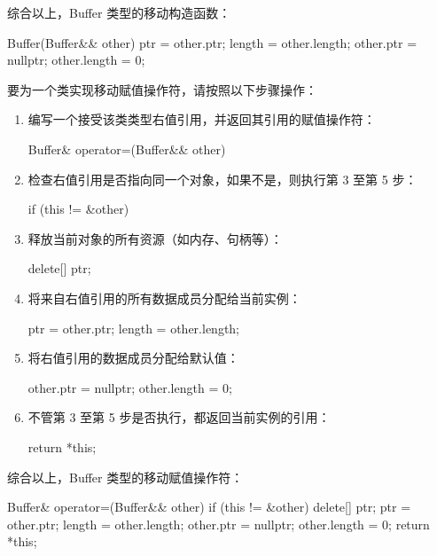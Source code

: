 综合以上，Buffer 类型的移动构造函数：

\begin{cpp}
Buffer(Buffer&& other)
{
    ptr = other.ptr;
    length = other.length;
    other.ptr = nullptr;
    other.length = 0;
}
\end{cpp}

要为一个类实现移动赋值操作符，请按照以下步骤操作：

\begin{enumerate}
\item
编写一个接受该类类型右值引用，并返回其引用的赋值操作符：

\begin{cpp}
Buffer& operator=(Buffer&& other)
{
}
\end{cpp}

\item
检查右值引用是否指向同一个对象，如果不是，则执行第 3 至第 5 步：

\begin{cpp}
if (this != &other)
{
}
\end{cpp}

\item
释放当前对象的所有资源（如内存、句柄等）：

\begin{cpp}
delete[] ptr;
\end{cpp}

\item
将来自右值引用的所有数据成员分配给当前实例：

\begin{cpp}
ptr = other.ptr;
length = other.length;
\end{cpp}

\item
将右值引用的数据成员分配给默认值：

\begin{cpp}
other.ptr = nullptr;
other.length = 0;
\end{cpp}

\item
不管第 3 至第 5 步是否执行，都返回当前实例的引用：

\begin{cpp}
return *this;
\end{cpp}
\end{enumerate}

综合以上，Buffer 类型的移动赋值操作符：

\begin{cpp}
Buffer& operator=(Buffer&& other)
{
    if (this != &other)
    {
        delete[] ptr;
        ptr = other.ptr;
        length = other.length;
        other.ptr = nullptr;
        other.length = 0;
    }
    return *this;
}
\end{cpp}

